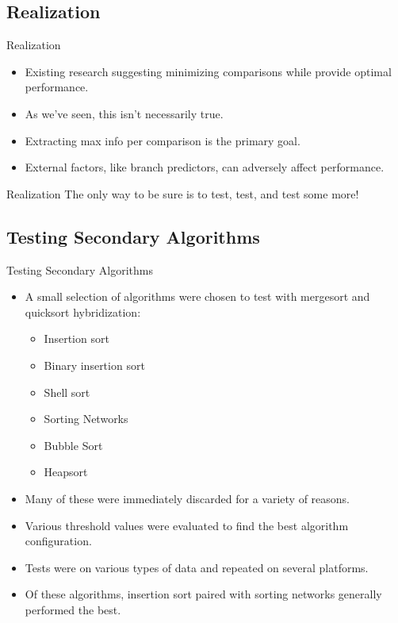 \documentclass[13pt]{beamer}
\begin{document}
\subsection{Realization}
\begin{frame}{Realization}
	\begin{itemize}[<+->]
		\item Existing research suggesting minimizing comparisons while provide
		      optimal performance.
		\item As we've seen, this isn't necessarily true.
		\item Extracting max info per comparison is the primary goal.
		\item External factors, like branch predictors, can adversely affect
		      performance.
	\end{itemize}
\end{frame}

\begin{frame}{Realization}
	\centering
	\Huge The only way to be sure is to test, test, and test some more!
\end{frame}

\subsection{Testing Secondary Algorithms}
\begin{frame}{Testing Secondary Algorithms}
	\begin{itemize}
		\item A small selection of algorithms were chosen to test with mergesort
		      and quicksort hybridization:
		      \begin{itemize}
			      \item Insertion sort
			      \item Binary insertion sort
			      \item Shell sort
			      \item Sorting Networks
			      \item Bubble Sort
			      \item Heapsort
		      \end{itemize}
		      \item\pause Many of these were immediately discarded for a variety of reasons.
		      \item\pause Various threshold values were evaluated to find the best
		      algorithm configuration.
		      \item\pause Tests were on various types of data and repeated on several
		      platforms.
		      \item\pause Of these algorithms, insertion sort paired with sorting
		      networks generally performed the best.
	\end{itemize}
\end{frame}
\end{document}

